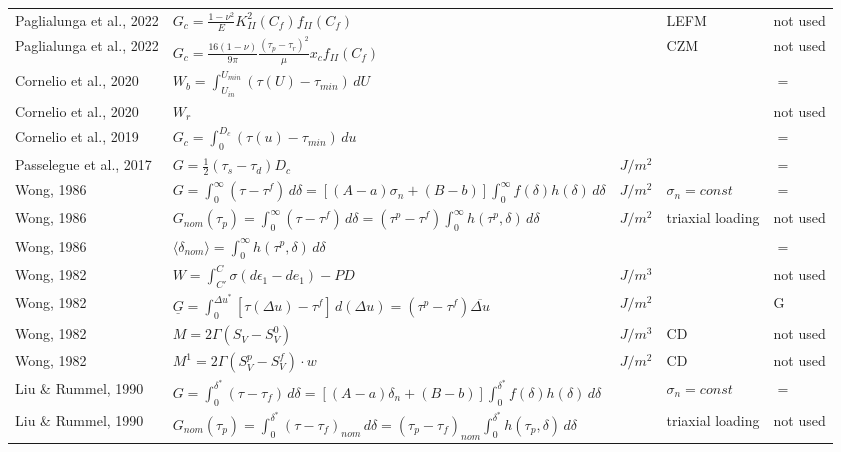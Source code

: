 \documentclass[12pt]{article}
\begin{document}
\begin{longtable}{|p{3.5 cm}|p{6.5 cm}|p{1.25 cm}|p{1.25 cm}|p{1.5 cm}|}
Paglialunga et al., 2022 & \( \displaystyle G_c = \frac{1-\nu^2}{E} K_{II}^2 (C_f) f_{II} (C_f)\) & & LEFM & not used \\
Paglialunga et al., 2022 & \( \displaystyle G_c = \frac{16(1-\nu)}{9\pi} \frac{(\tau_p-\tau_r)^2}{\mu} x_c f_{II} (C_f) \) & & CZM & not used \\
Cornelio et al., 2020 & \( \displaystyle W_b = \int_{U_{in}}^{U_{min}} (\tau(U) - \tau_{min}) \,d U \) & & & $=$ \\
Cornelio et al., 2020 & \( \displaystyle W_r \) & & & not used \\
Cornelio et al., 2019 & \( \displaystyle G_c = \int_{0}^{D_c} (\tau(u) - \tau_{min}) \,d u \) & & & $=$ \\
Passelegue et al., 2017 & \( \displaystyle G = \frac{1}{2} (\tau_s - \tau_d) D_c \) & $J/m^2$ & & $=$ \\
Wong, 1986 & \( \displaystyle G = \int_{0}^{\infty} (\tau - \tau^f) \,d \delta = [(A-a)\sigma_n + (B-b)] \int_{0}^{\infty} f(\delta) h(\delta) \,d \delta \) & $J/m^2$ & $\sigma_n = const $ & $=$ \\
Wong, 1986 & \( \displaystyle G_{nom}(\tau_p) = \int_{0}^{\infty} (\tau-\tau^f) \,d\delta = (\tau^p-\tau^f) \int_{0}^{\infty} h(\tau^p,\delta) \,d\delta \) & $J/m^2$ & triaxial loading & not used \\
Wong, 1986 & \( \displaystyle \langle \delta_{nom} \rangle = \int_{0}^{\infty} h(\tau^p,\delta) \,d\delta \) & & & $=$ \\
Wong, 1982 & \( \displaystyle W = \int_{C'}^{C} \sigma(d \epsilon_1 - d e_1) - P D \) & $J/m^3$ & & not used \\
Wong, 1982 & \( \displaystyle \underline{G} = \int_{0}^{\Delta u^*} [\tau(\Delta u) -\tau^f] \,d(\Delta u) = (\tau^p-\tau^f) \overline{\Delta u} \) & $J/m^2$ & & G \\
Wong, 1982 & \( \displaystyle M = 2 \Gamma (S_V - S_V^0) \) & $J/m^3$ & CD & not used \\
Wong, 1982 & \( \displaystyle M^1 = 2 \Gamma (S_V^p - S_V^f) \cdot w \) & $J/m^2$ & CD & not used \\
Liu \& Rummel, 1990 & \( \displaystyle G = \int_{0}^{\delta^*} (\tau - \tau_f) \,d\delta = [(A-a)\delta_n + (B-b)] \int_{0}^{\delta^*} f(\delta) h(\delta) \,d\delta \) & & $\sigma_n = const$ & $=$ \\
Liu \& Rummel, 1990 & \( \displaystyle G_{nom}(\tau_p) = \int_{0}^{\delta^*} (\tau - \tau_f)_{nom} \,d\delta = (\tau_p-\tau_f)_{nom} \int_{0}^{\delta^*} h(\tau_p,\delta) \,d\delta \) & & triaxial loading & not used \\

\end{longtable}
\end{document}
